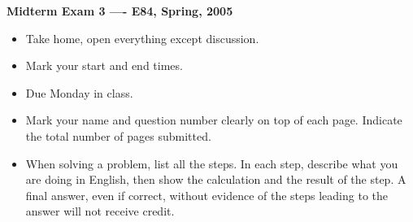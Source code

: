 \usepackage{html}

\begin{center}
{\Large \bf  Midterm Exam 3 ---- E84, Spring, 2005}
\end{center}

\begin{itemize}
\item Take home, open everything except discussion.
\item Mark your start and end times. %
\item Due Monday in class.
\item Mark your name and question number clearly on top of each page.
	Indicate the total number of pages submitted.
\item When solving a problem, list all the steps. In each step, describe 
	what you are doing in English, then show the calculation and the 
	result of the step. A final answer, even if correct, without 
	evidence of the steps leading to the answer will not receive credit.
\end{itemize}

